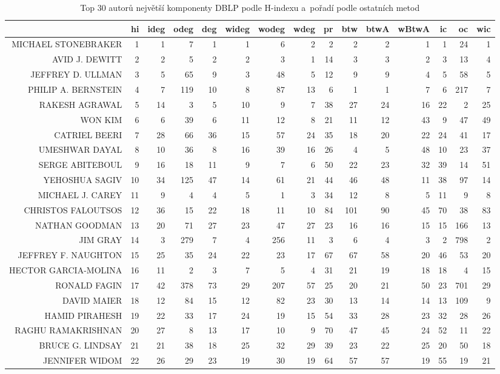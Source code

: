 \documentclass{bakalarka}
\begin{document}
\begin{table}[!ht]
\centering
\caption{Top 30 autorů největší komponenty DBLP podle H-indexu a~pořadí podle ostatních metod}
\label{tab:ranks2}
\begin{sideways}
\begin{scriptsize}
\begin{tabular}{r|r|rrrrrrrrrrrrr}
\toprule
&hi&ideg&odeg&deg&wideg&wodeg&wdeg&pr&btw&btwA&wBtwA&ic&oc&wic\\
\midrule
MICHAEL STONEBRAKER&1&1&7&1&1&6&2&2&2&2&1&1&24&1\\
AVID J. DEWITT&2&2&5&2&2&3&1&14&3&3&2&3&13&4\\
JEFFREY D. ULLMAN&3&5&65&9&3&48&5&12&9&9&4&5&58&5\\
PHILIP A. BERNSTEIN&4&7&119&10&8&87&13&6&1&1&7&6&217&7\\
RAKESH AGRAWAL&5&14&3&5&10&9&7&38&27&24&16&22&2&25\\
WON KIM&6&6&39&6&11&12&8&21&11&12&43&9&47&49\\
CATRIEL BEERI&7&28&66&36&15&57&24&35&18&20&22&24&41&17\\
UMESHWAR DAYAL&8&10&36&8&16&39&16&26&4&5&48&10&23&37\\
SERGE ABITEBOUL&9&16&18&11&9&7&6&50&22&23&32&39&14&51\\
YEHOSHUA SAGIV&10&34&125&47&14&61&21&44&46&48&11&38&97&14\\
MICHAEL J. CAREY&11&9&4&4&5&1&3&34&12&8&5&11&9&8\\
CHRISTOS FALOUTSOS&12&36&15&22&18&11&10&84&101&90&45&70&38&83\\
NATHAN GOODMAN&13&20&71&27&23&47&27&23&16&16&15&15&166&13\\
JIM GRAY&14&3&279&7&4&256&11&3&6&4&3&2&798&2\\
JEFFREY F. NAUGHTON&15&25&35&24&22&23&17&67&67&58&20&46&53&20\\
HECTOR GARCIA-MOLINA&16&11&2&3&7&5&4&31&21&19&18&18&4&15\\
RONALD FAGIN&17&42&378&73&29&207&57&25&20&21&50&23&701&29\\
DAVID MAIER&18&12&84&15&12&82&23&30&13&14&14&13&109&9\\
HAMID PIRAHESH&19&22&33&17&24&19&15&54&33&28&23&32&28&26\\
RAGHU RAMAKRISHNAN&20&27&8&13&17&10&9&70&47&45&24&52&11&22\\
BRUCE G. LINDSAY&21&21&38&18&25&32&29&39&23&22&25&20&50&18\\
JENNIFER WIDOM&22&26&29&23&19&30&19&64&57&57&19&55&19&21\\

\end{tabular}
\end{scriptsize}
\end{sideways}
\end{table}
\end{document}
